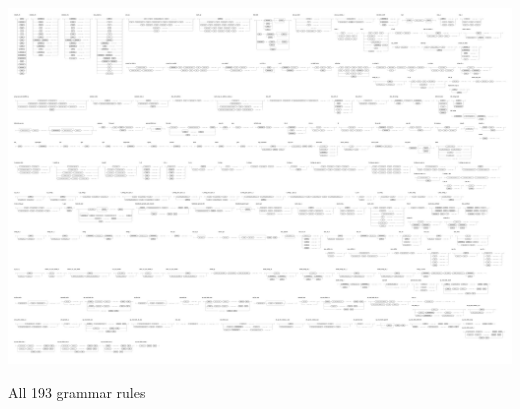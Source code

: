 \documentclass[10pt,a4paper]{report}
\begin{document}
\begin{appendices}
\begin{foldoutfloatlandscape}
	\includegraphics[width=45cm]{img/grammar}
	\caption{All 193 grammar rules}
\end{foldoutfloatlandscape}



\end{appendices}
\end{document}
